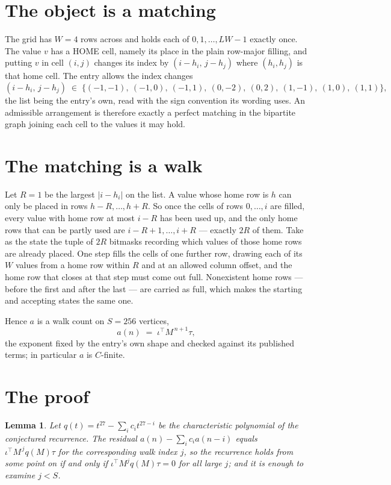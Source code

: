 \documentclass[11pt,a4paper]{article}
\theoremstyle{plain}
\newtheorem{lemma}[theorem]{Lemma}
\theoremstyle{definition}
\begin{document}
\section{The object is a matching}

The grid has $W=4$ rows across and holds each of $0,1,\dots,LW-1$ exactly once. The value
$v$ has a HOME cell, namely its place in the plain row-major filling, and putting $v$ in cell
$(i,j)$ changes its index by $(i-h_i,\,j-h_j)$ where $(h_i,h_j)$ is that home cell. The entry
allows the index changes
\[
(i-h_i,\,j-h_j)\;\in\;\{(-1,-1),\ (-1,0),\ (-1,1),\ (0,-2),\ (0,2),\ (1,-1),\ (1,0),\ (1,1)\},
\]
the list being the entry's own, read with the sign convention its wording uses. An admissible
arrangement is therefore exactly a perfect matching in the bipartite graph joining each cell to
the values it may hold.

\section{The matching is a walk}

Let $R=1$ be the largest $|i-h_i|$ on the list. A value whose home row is $h$ can only be
placed in rows $h-R,\dots,h+R$. So once the cells of rows $0,\dots,i$ are filled, every
value with home row at most $i-R$ has been used up, and the only home rows that can be
partly used are $i-R+1,\dots,i+R$ --- exactly $2R$ of them. Take as the state the tuple of
$2R$ bitmasks recording which values of those home rows are already placed. One step fills
the cells of one further row, drawing each of its $W$ values from a home row within $R$
and at an allowed column offset, and the home row that closes at that step must come out
full. Nonexistent home rows --- before the first and after the last --- are carried as
full, which makes the starting and accepting states the same one.

Hence $a$ is a walk count on $S=256$ vertices,
\[
a(n)\;=\;\iota^{\!\top}M^{\,n+1}\tau ,
\]
the exponent fixed by the entry's own shape and checked against its published terms; in
particular $a$ is $C$-finite.

\section{The proof}

\begin{lemma}\label{lem:crit}
Let $q(t)=t^{27}-\sum_i c_it^{27-i}$ be the characteristic polynomial of the
conjectured recurrence. The residual $a(n)-\sum_ic_ia(n-i)$ equals
$\iota^{\!\top}M^{\,j}q(M)\tau$ for the corresponding walk index $j$, so the recurrence
holds from some point on if and only if $\iota^{\!\top}M^{j}q(M)\tau=0$ for all large $j$;
and it is enough to examine $j<S$.
\end{lemma}
\end{document}
